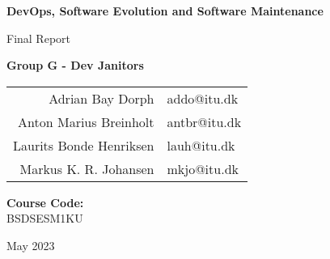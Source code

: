 \begin{titlepage}
    \begin{center}
       \vspace*{0.5cm}

        \huge
        \textbf{DevOps, Software Evolution and Software Maintenance}

        \vspace{0.5cm}
        \Large
        Final Report
            
        \vspace{1.5cm}

        \large
        \textbf{Group G - Dev Janitors} \\
        \vspace{0.25cm}
        \begin{tabular}{r l}
            Adrian Bay Dorph & addo@itu.dk        \\
            Anton Marius Breinholt & antbr@itu.dk        \\
            Laurits Bonde Henriksen & lauh@itu.dk \\
            Markus K. R. Johansen & mkjo@itu.dk   \\
        \end{tabular}

        \vspace{5cm}
        \large
        \textbf{Course Code:}\\
        BSDSESM1KU
        
        \vfill

        

        \vspace{0.8cm}
        May 2023
    \end{center}
\end{titlepage}
